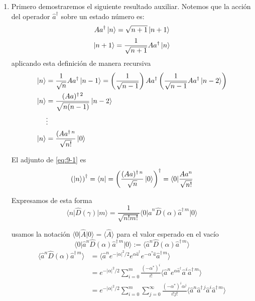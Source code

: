 \begin{enumerate}
\item Primero demostraremos el siguiente resultado auxiliar. Notemos que la acción del operador $\hat{a}^{\dagger}$ sobre un estado número es:
\begin{equation*}
A{a}^{\dagger}\ket{n} = \sqrt{n+1}\ket{n+1}
\end{equation*}
\begin{equation*}
\ket{n+1} = \frac{1}{\sqrt{n+1}}A{a}^{\dagger}\ket{n}
\end{equation*}
aplicando esta definición de manera recursiva
\begin{align}
\ket{n} & = \frac{1}{\sqrt{n}}A{a}^{\dagger}\ket{n-1} = \left( \frac{1}{\sqrt{n-1}} \right)A{a}^{\dagger}\left( \frac{1}{\sqrt{n-1}} A{a}^{\dagger} \ket{n-2} \right) \nonumber \\
\ket{n} & = \frac{(A{a})^{\dagger\,2}}{\sqrt{n(n-1)}}\ket{n-2} \nonumber                                                                                       \\
& \vdots \nonumber                                                                                                                           \\
\ket{n} & = \frac{(A{a}^{\dagger\,n}}{\sqrt{n!}}\ket{0} \label{eq:9-1}
\end{align}

El adjunto de \ref{eq:9-1} es
\begin{equation}
\left( \ket{n} \right)^{\dagger} = \langle n | = \left( \frac{(A{a})^{\dagger\,n}}{\sqrt{n}}\ket{0} \right)^\dagger = \langle 0 | \frac{A{a}^n}{\sqrt{n!}}\label{eq:9-2}
\end{equation}

Expresamos de esta forma
\begin{equation}
\langle n \vert \hat{D}(\gamma) \vert m \rangle = \frac{1}{\sqrt{n!m!}} \langle 0 \vert  \hat{a}^{n} \hat{D}(\alpha)\hat{a}^{\dagger\,m}\vert 0 \rangle \label{eq:9-4}
\end{equation}

usamos la notación $\langle 0 \vert \hat{A} \vert 0 \rangle = \langle \hat{A} \rangle$ para el valor esperado en el vacío
\begin{equation*}
\langle 0 \vert \hat{a}^{n} \hat{D}(\alpha) \hat{a}^{\dagger\,m} \vert 0\rangle := \langle \hat{a}^{n} \hat{D}(\alpha) \hat{a}^{\dagger\,m} \rangle
\end{equation*}
\begin{align*}
\langle \hat{a}^{n} \hat{D}(\alpha) \hat{a}^{\dagger\,m} \rangle & = \langle \hat{a}^{n}  e^{-|\alpha|^2/2} e^{\alpha \hat{a}^{\dagger}}e^{-\alpha^{*}\hat{a}} \hat{a}^{\dagger\,m} \rangle                                                              \\
& = e^{-|\alpha|^2/2}\sum_{i=0}^{m} \frac{(-\alpha^*)^{i}}{i!}\langle \hat{a}^{n} e^{\alpha \hat{a}^{\dagger}} \hat{a}^{i} \hat{a}^{\dagger\,m} \rangle                             \\
& = e^{-|\alpha|^2/2}\sum_{i=0}^{m} \sum_{j=0}^{\infty} \frac{(-\alpha^*)^{i} \alpha^{j}}{i!j!}\langle \hat{a}^{n} \hat{a}^{\dagger\,j} \hat{a}^{i} \hat{a}^{\dagger\,m} \rangle
\end{align*}


\end{enumerate}
